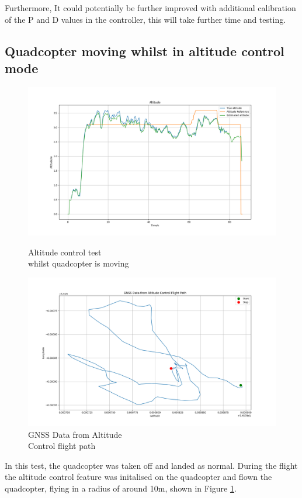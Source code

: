 \documentclass{report}
\begin{document}
Furthermore, It could potentially be further improved with additional
calibration of the P and D values in the controller, this will take further time
and testing. 


\subsection*{Quadcopter moving whilst in altitude control mode}
\begin{figure}[H]
  \begin{minipage}{0.5\textwidth}
    \centering
    \includegraphics[width=1\textwidth]{Pictures/Altitude_hold_test_moving.png}
    \captionsetup{justification=centering}
    \caption{Altitude control test \\ whilst quadcopter is moving}
    \label{fig:Altitude_hold_test_moving}
  \end{minipage}
  \begin{minipage}{0.5\textwidth}
    \centering
    \includegraphics[width=1\textwidth]{Pictures/GNSS_Altitude_hold_test_moving.png}
    \captionsetup{justification=centering}
    \caption{GNSS Data from Altitude \\ Control flight path}
    \label{fig:GNSS_Altitude_hold_test_moving}
  \end{minipage}
\end{figure}
In this test, the quadcopter was taken off and landed as normal. During the
flight the altitude control feature was initalised on the quadcopter and flown
the quadcopter, flying in a radius of around 10m, shown in
Figure \ref{fig:GNSS_Altitude_hold_test_moving}.
\end{document}
